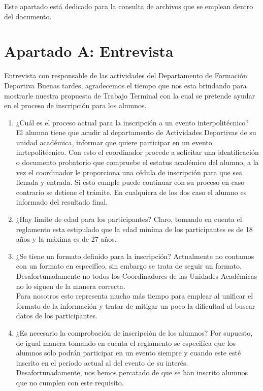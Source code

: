 \appendix
\clearpage
\addappheadtotoc
\appendixpage

	\noindent Este apartado está dedicado para la consulta de archivos que se emplean dentro del documento. 
	
	\chapter{Apartado A: Entrevista}
	\label{Entrevista}
	Entrevista con responsable de las actividades del Departamento de Formación Deportiva
	Buenas tardes, agradecemos el tiempo que nos esta brindando para mostrarle nuestra propuesta de Trabajo Terminal con la cual se pretende ayudar en el proceso de inscripción para los alumnos.
	
	\begin{enumerate}
		\item ¿Cuál es el proceso actual para la inscripción a un evento interpolitécnico?\\
		El alumno tiene que acudir al departamento de Actividades Deportivas de su unidad académica, informar que quiere participar en un evento inrtepolitécnico. Con esto el coordinador procede a solicitar una identificación o documento probatorio que compruebe el estatus académico del alumno, a la vez el coordinador le proporciona una cédula de inscripción para que sea llenada y entrada. Si esto cumple puede continuar con su proceso en caso contrario se detiene el trámite. En cualquiera de los dos caso el alumno es informado del resultado final.
		
		\item ¿Hay límite de edad para los participantes?
		Claro, tomando en cuenta el reglamento esta estipulado que la edad miníma de los participantes es de 18 años y la máxima es de 27 años.
		
		\item ¿Se tiene un formato definido para la inscripción?
		Actualmente no contamos con un formato en especifíco, sin embargo se trata de seguir un formato. Desafortunadamente no todos los Coordinadores de las Unidades Académicas no lo siguen de la manera correcta.\\ 
		Para nosotros esto representa mucho más tiempo para emplear al unificar el formato de la información y tratar de mitigar un poco la dificultad al buscar datos de los participantes.
		
		\item ¿Es necesario la comprobación de inscripción de los alumnos?
		Por supuesto, de igual manera tomando en cuenta el reglamento se especifíca que los alumnos solo podrán participar en un evento siempre y cuando este esté inscrito en el periodo actual al del evento de su interés.\\
		Desafortunadamente, nos hemos percatado de que se han inscrito alumnos que no cumplen con este requisito.
		

\end{enumerate}
